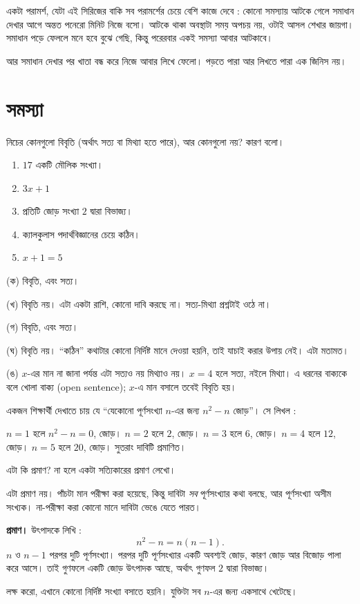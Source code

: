 \documentclass[11pt]{article}
\begin{document}
\begin{remark}
একটা পরামর্শ, যেটা এই সিরিজের বাকি সব পরামর্শের চেয়ে বেশি কাজে দেবে : কোনো
সমস্যায় আটকে গেলে সমাধান দেখার আগে অন্তত পনেরো মিনিট নিজে বসো। আটকে থাকা
অবস্থাটা সময় অপচয় নয়, ওটাই আসল শেখার জায়গা। সমাধান পড়ে ফেললে মনে হবে বুঝে গেছি,
কিন্তু পরেরবার একই সমস্যা আবার আটকাবে।

আর সমাধান দেখার পর খাতা বন্ধ করে নিজে আবার লিখে ফেলো। পড়তে পারা আর লিখতে পারা
এক জিনিস নয়।
\end{remark}

\section{সমস্যা}

 নিচের কোনগুলো বিবৃতি (অর্থাৎ সত্য বা মিথ্যা হতে পারে), আর কোনগুলো নয়?
কারণ বলো।

\begin{enumerate}
  \item $17$ একটি মৌলিক সংখ্যা।
  \item $3x + 1$
  \item প্রতিটি জোড় সংখ্যা $2$ দ্বারা বিভাজ্য।
  \item ক্যালকুলাস পদার্থবিজ্ঞানের চেয়ে কঠিন।
  \item $x + 1 = 5$
\end{enumerate}

\begin{sol}
(ক) বিবৃতি, এবং সত্য।

(খ) বিবৃতি নয়। এটা একটা রাশি, কোনো দাবি করছে না। সত্য-মিথ্যা প্রশ্নটাই ওঠে না।

(গ) বিবৃতি, এবং সত্য।

(ঘ) বিবৃতি নয়। ``কঠিন'' কথাটার কোনো নির্দিষ্ট মানে দেওয়া হয়নি, তাই যাচাই করার
উপায় নেই। এটা মতামত।

(ঙ) $x$-এর মান না জানা পর্যন্ত এটা সত্যও নয় মিথ্যাও নয়। $x = 4$ হলে সত্য, নইলে
মিথ্যা। এ ধরনের বাক্যকে বলে খোলা বাক্য (open sentence); $x$-এ মান বসালে তবেই
বিবৃতি হয়।
\end{sol}

 একজন শিক্ষার্থী দেখাতে চায় যে ``যেকোনো পূর্ণসংখ্যা $n$-এর জন্য
$n^2 - n$ জোড়''। সে লিখল :

\smallskip
\noindent
$n = 1$ হলে $n^2 - n = 0$, জোড়। $n = 2$ হলে $2$, জোড়। $n = 3$ হলে $6$, জোড়।
$n = 4$ হলে $12$, জোড়। $n = 5$ হলে $20$, জোড়। সুতরাং দাবিটি প্রমাণিত।

\smallskip
\noindent
এটা কি প্রমাণ? না হলে একটা সত্যিকারের প্রমাণ লেখো।

\begin{sol}
এটা প্রমাণ নয়। পাঁচটা মান পরীক্ষা করা হয়েছে, কিন্তু দাবিটা \emph{সব}
পূর্ণসংখ্যার কথা বলছে, আর পূর্ণসংখ্যা অসীম সংখ্যক। না-পরীক্ষা করা কোনো মানে
দাবিটা ভেঙে যেতে পারত।

\medskip
\textbf{প্রমাণ।} উৎপাদকে লিখি :
\[
  n^2 - n = n(n-1) .
\]
$n$ ও $n-1$ পরপর দুটি পূর্ণসংখ্যা। পরপর দুটি পূর্ণসংখ্যার একটি অবশ্যই জোড়,
কারণ জোড় আর বিজোড় পালা করে আসে। তাই গুণফলে একটি জোড় উৎপাদক আছে, অর্থাৎ
গুণফল $2$ দ্বারা বিভাজ্য।

লক্ষ করো, এখানে কোনো নির্দিষ্ট সংখ্যা বসাতে হয়নি। যুক্তিটা সব $n$-এর জন্য
একসাথে খেটেছে।
\end{sol}
\end{document}
